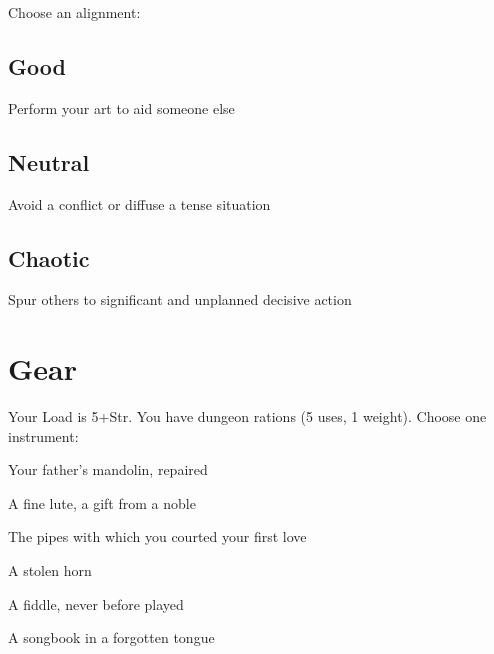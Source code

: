 \startInstructionsAfterHeader
Choose an alignment:
\stopInstructionsAfterHeader
       

         
\subsection{Good}   
         

Perform your art to aid someone else

         
\subsection{Neutral}   
         

Avoid a conflict or diffuse a tense situation

         
\subsection{Chaotic}   
         

Spur others to significant and unplanned decisive action

       

       
\section{Gear}   
       

         

Your Load is 5+Str. You have dungeon rations (5 uses, 1 weight). Choose one instrument:

         
\startitemize[1,packed]
           
\item Your father's mandolin, repaired

           
\item A fine lute, a gift from a noble

           
\item The pipes with which you courted your first love

           
\item A stolen horn

           
\item A fiddle, never before played

           
\item A songbook in a forgotten tongue

         
\stopitemize
         

